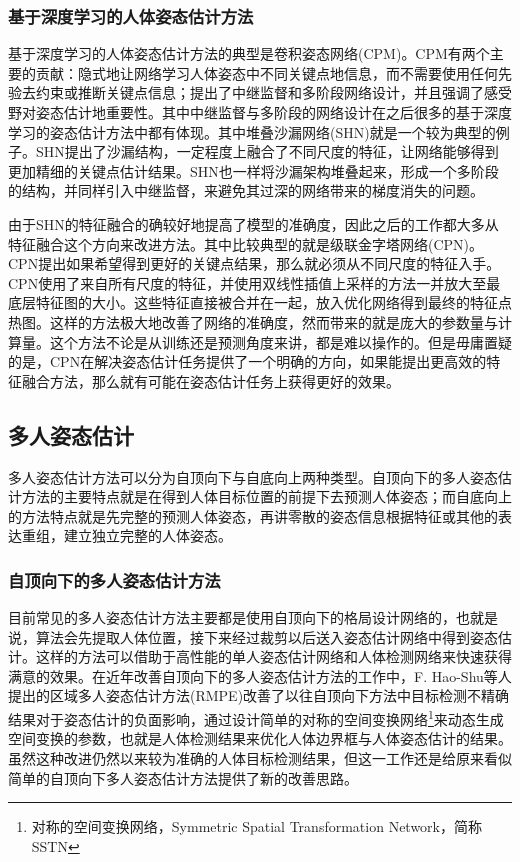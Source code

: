 \subsubsection{基于深度学习的人体姿态估计方法}
\label{subsubsec:deeppose}
基于深度学习的人体姿态估计方法的典型是卷积姿态网络(CPM)\cite{wei2016convolutional}。CPM有两个主要的贡献：隐式地让网络学习人体姿态中不同关键点地信息，而不需要使用任何先验去约束或推断关键点信息；提出了中继监督和多阶段网络设计，并且强调了感受野对姿态估计地重要性。其中中继监督与多阶段的网络设计在之后很多的基于深度学习的姿态估计方法中都有体现。其中堆叠沙漏网络(SHN)\cite{newell2016stacked}就是一个较为典型的例子。SHN提出了沙漏结构，一定程度上融合了不同尺度的特征，让网络能够得到更加精细的关键点估计结果。SHN也一样将沙漏架构堆叠起来，形成一个多阶段的结构，并同样引入中继监督，来避免其过深的网络带来的梯度消失的问题。

由于SHN的特征融合的确较好地提高了模型的准确度，因此之后的工作都大多从特征融合这个方向来改进方法。其中比较典型的就是级联金字塔网络(CPN)\cite{Chen2017Cascaded}。CPN提出如果希望得到更好的关键点结果，那么就必须从不同尺度的特征入手。CPN使用了来自所有尺度的特征，并使用双线性插值上采样的方法一并放大至最底层特征图的大小。这些特征直接被合并在一起，放入优化网络得到最终的特征点热图。这样的方法极大地改善了网络的准确度，然而带来的就是庞大的参数量与计算量。这个方法不论是从训练还是预测角度来讲，都是难以操作的。但是毋庸置疑的是，CPN在解决姿态估计任务提供了一个明确的方向，如果能提出更高效的特征融合方法，那么就有可能在姿态估计任务上获得更好的效果。

\subsection{多人姿态估计}
\label{subsubsec:multipose}
多人姿态估计方法可以分为自顶向下与自底向上两种类型。自顶向下的多人姿态估计方法的主要特点就是在得到人体目标位置的前提下去预测人体姿态；而自底向上的方法特点就是先完整的预测人体姿态，再讲零散的姿态信息根据特征或其他的表达重组，建立独立完整的人体姿态。
\subsubsection{自顶向下的多人姿态估计方法}
\label{subsubsec:topdownpose}
目前常见的多人姿态估计方法主要都是使用自顶向下的格局设计网络的，也就是说，算法会先提取人体位置，接下来经过裁剪以后送入姿态估计网络中得到姿态估计。这样的方法可以借助于高性能的单人姿态估计网络和人体检测网络来快速获得满意的效果。在近年改善自顶向下的多人姿态估计方法的工作中，F. Hao-Shu\cite{fang2017rmpe}等人提出的区域多人姿态估计方法(RMPE)改善了以往自顶向下方法中目标检测不精确结果对于姿态估计的负面影响，通过设计简单的对称的空间变换网络\footnote{对称的空间变换网络，Symmetric Spatial Transformation Network，简称SSTN}来动态生成空间变换的参数，也就是人体检测结果来优化人体边界框与人体姿态估计的结果。虽然这种改进仍然以来较为准确的人体目标检测结果，但这一工作还是给原来看似简单的自顶向下多人姿态估计方法提供了新的改善思路。

